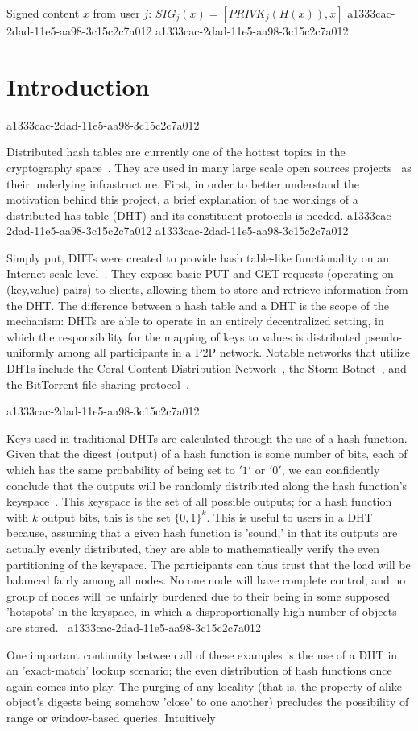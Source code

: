 \documentclass[12pt]{article}
\begin{document}
Signed content $x$ from user $j$: $SIG_j(x) = \left[ PRIVK_j( H(x) ), x \right]$
a1333cac-2dad-11e5-aa98-3c15c2c7a012
a1333cac-2dad-11e5-aa98-3c15c2c7a012\section{Introduction}
a1333cac-2dad-11e5-aa98-3c15c2c7a012\par Distributed hash tables are currently one of the hottest topics in the cryptography space~\cite{Stoica:2001dj,Rowstron:2001ea,Ratnasamy:2001wn}. They are used in many large scale open sources projects~\cite{Freitas:2013tb,Xu:2010vs,Perfitt:2010fh} as their underlying infrastructure. First, in order to better understand the motivation behind this project, a brief explanation of the workings of a distributed has table (DHT) and its constituent protocols is needed.
a1333cac-2dad-11e5-aa98-3c15c2c7a012
a1333cac-2dad-11e5-aa98-3c15c2c7a012\par Simply put, DHTs were created to provide hash table-like functionality on an Internet-scale level~\cite{Ratnasamy:2001wn}. They expose basic PUT and GET requests (operating on (key,value) pairs) to clients, allowing them to store and retrieve information from the DHT. The difference between a hash table and a DHT is the scope of the mechanism: DHTs are able to operate in an entirely decentralized setting, in which the responsibility for the mapping of keys to values is distributed pseudo-uniformly among all participants in a P2P network. Notable networks that utilize DHTs include the Coral Content Distribution Network~\cite{Freedman:2004vb}, the Storm Botnet~\cite{Holz:2008uk}, and the BitTorrent file sharing protocol~\cite{Cohen:y1_8mBnw}.

a1333cac-2dad-11e5-aa98-3c15c2c7a012\par Keys used in traditional DHTs are calculated through the use of a hash function. Given that the digest (output) of a hash function is some number of bits, each of which has the same probability of being set to $'1'$ or $'0'$, we can confidently conclude that the outputs will be randomly distributed along the hash function's keyspace~. This keyspace is the set of all possible outputs; for a hash function with $k$ output bits, this is the set $\{0,1\}^k$. This is useful to users in a DHT because, assuming that a given hash function is 'sound,' in that its outputs are actually evenly distributed, they are able to mathematically verify the even partitioning of the keyspace. The participants can thus trust that the load will be balanced fairly among all nodes. No one node will have complete control, and no group of nodes will be unfairly burdened due to their being in some supposed 'hotspots' in the keyspace, in which a disproportionally high number of objects are stored.~
a1333cac-2dad-11e5-aa98-3c15c2c7a012
\par One important continuity between all of these examples is the use of a DHT in an 'exact-match' lookup scenario; the even distribution of hash functions once again comes into play. The purging of any locality (that is, the property of alike object's digests being somehow 'close' to one another) precludes the possibility of range or window-based queries. Intuitively
\end{document}

